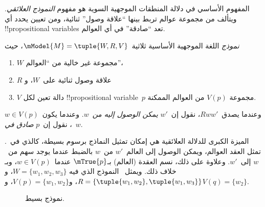\documentclass[../../../include/open-logic-section]{subfiles}
\begin{document}


المفهوم الأساسي في دلالة المنطقات الموجهية السوية هو مفهوم
\emph{النموذج العلائقي}. ويتألف من مجموعة عوالم تربط بينها ``علاقة
وصول'' ثنائية، ومن تعيين يحدد أي !!{propositional variable}s تعد
``صادقة'' في أي العوالم.

\begin{defn}
  \emph{نموذج} اللغة الموجهية الأساسية ثلاثية~$\mModel{M}
  = \tuple{W, R, V}$، حيث
  \begin{enumerate}
  \item $W$ مجموعة غير خالية من ``العوالم''،
  \item $R$ علاقة وصول ثنائية على~$W$، و
  \item $V$ دالة تعين لكل !!{propositional variable}~$p$ مجموعة
    $V(p)$ من العوالم الممكنة.
  \end{enumerate}
  وعندما يصدق~$Rww'$، نقول إن~$w'$ \emph{يمكن الوصول إليه من}~$w$.
  وعندما يكون~$w \in V(p)$، نقول إن~$p$ \emph{صادق في}~$w$.
\end{defn}

الميزة الكبرى للدلالة العلائقية هي إمكان تمثيل النماذج برسوم بسيطة،
كالذي في~. تمثل العقد العوالم، ويمكن الوصول إلى
العالم~$w'$ من~$w$ بالضبط عندما يوجد سهم من~$w$ إلى~$w'$. وعلاوة على
ذلك، نسم العقدة (العالم) بـ$\mTrue{p}$ عندما~$w \in V(p)$، وبـ
 خلاف ذلك. ويمثل~ النموذج الذي فيه
$W = \{w_1, w_2, w_3\}$، و$R = \{\tuple{w_1, w_2},\tuple{w_1,
  w_3}\}$، و$V(p) = \{w_1, w_2\}$، و$V(q) = \{w_2\}$.

\begin{figure}
  \begin{center}
  \end{center}
  \caption{نموذج بسيط.}
\end{figure}
\end{document}
